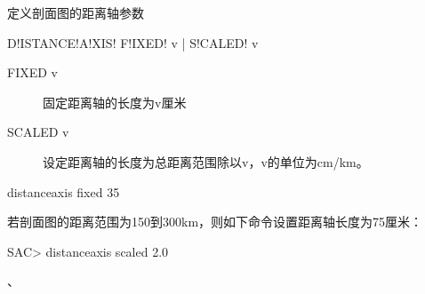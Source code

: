 \label{sss:distanceaxis}

定义剖面图的距离轴参数

\begin{SACSTX}
    D!ISTANCE!A!XIS! F!IXED! v | S!CALED! v
\end{SACSTX}

\begin{description}
\item [FIXED v] 固定距离轴的长度为v厘米
\item [SCALED v] 设定距离轴的长度为总距离范围除以v，v的单位为cm/km。
\end{description}

\begin{SACDFT}
distanceaxis fixed 35
\end{SACDFT}

若剖面图的距离范围为150到300km，则如下命令设置距离轴长度为75厘米：
\begin{SACCode}
SAC> distanceaxis scaled 2.0
\end{SACCode}

、
